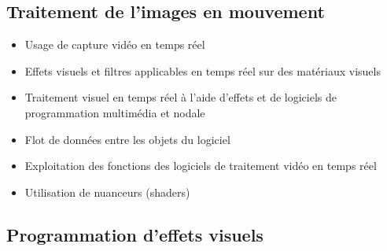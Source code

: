 \documentclass[
]{book}
\providecommand{\tightlist}{%
  \setlength{\itemsep}{0pt}\setlength{\parskip}{0pt}}
\begin{document}
\hypertarget{traitement-de-limages-en-mouvement}{%
\subsection{Traitement de l'images en mouvement}\label{traitement-de-limages-en-mouvement}}

\begin{itemize}
\tightlist
\item
  Usage de capture vidéo en temps réel\\
\item
  Effets visuels et filtres applicables en temps réel sur des matériaux visuels\\
\item
  Traitement visuel en temps réel à l'aide d'effets et de logiciels de programmation multimédia et nodale
\item
  Flot de données entre les objets du logiciel
\item
  Exploitation des fonctions des logiciels de traitement vidéo en temps réel
\item
  Utilisation de nuanceurs (shaders)
\end{itemize}

\hypertarget{programmation-deffets-visuels}{%
\subsection{Programmation d'effets visuels}\label{programmation-deffets-visuels}}
\end{document}

